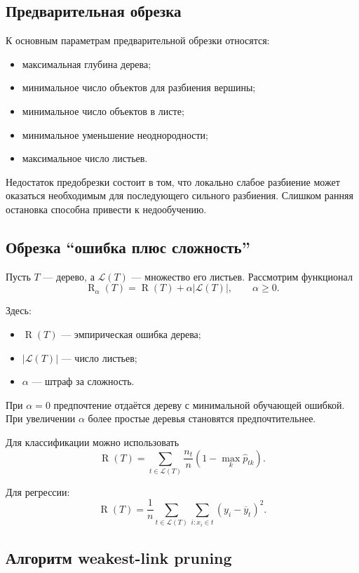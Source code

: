\documentclass[12pt,a4paper]{article}
\theoremstyle{plain}
\theoremstyle{definition}
\theoremstyle{remark}
\newcommand{\Risk}{\operatorname{R}}
\begin{document}
\subsection{Предварительная обрезка}

К основным параметрам предварительной обрезки относятся:
\begin{itemize}
    \item максимальная глубина дерева;
    \item минимальное число объектов для разбиения вершины;
    \item минимальное число объектов в листе;
    \item минимальное уменьшение неоднородности;
    \item максимальное число листьев.
\end{itemize}

Недостаток предобрезки состоит в том, что локально слабое разбиение может
оказаться необходимым для последующего сильного разбиения. Слишком
ранняя остановка способна привести к недообучению.

\subsection{Обрезка ``ошибка плюс сложность''}

Пусть $T$ --- дерево, а $\mathcal{L}(T)$ --- множество его листьев.
Рассмотрим функционал
\[
    \Risk_\alpha(T)
    =
    \Risk(T)
    +
    \alpha|\mathcal{L}(T)|,
    \qquad \alpha\ge 0.
\]

Здесь:
\begin{itemize}
    \item $\Risk(T)$ --- эмпирическая ошибка дерева;
    \item $|\mathcal{L}(T)|$ --- число листьев;
    \item $\alpha$ --- штраф за сложность.
\end{itemize}

При $\alpha=0$ предпочтение отдаётся дереву с минимальной обучающей
ошибкой. При увеличении $\alpha$ более простые деревья становятся
предпочтительнее.

Для классификации можно использовать
\[
    \Risk(T)
    =
    \sum_{t\in\mathcal{L}(T)}
    \frac{n_t}{n}
    \left(
        1-\max_k\widehat{p}_{tk}
    \right).
\]

Для регрессии:
\[
    \Risk(T)
    =
    \frac{1}{n}
    \sum_{t\in\mathcal{L}(T)}
    \sum_{i:x_i\in t}
    (y_i-\overline{y}_t)^2.
\]

\subsection{Алгоритм weakest-link pruning}
\end{document}

